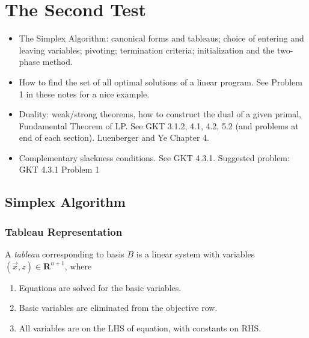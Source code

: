 \chapter{The Second Test}

\begin{itemize}
    \item The Simplex Algorithm: canonical forms and tableaus; choice of entering and leaving variables; pivoting; termination criteria; initialization and the two-phase method.
    \item How to find the set of all optimal solutions of a linear program. See Problem 1 in these notes for a nice example.
    \item Duality: weak/strong theorems, how to construct the dual of a given primal, Fundamental Theorem of LP. See GKT 3.1.2, 4.1, 4.2, 5.2 (and problems at end of each section). Luenberger and Ye Chapter 4.
    \item Complementary slackness conditions. See GKT 4.3.1. Suggested problem: GKT 4.3.1 Problem 1
\end{itemize}



\section{Simplex Algorithm}


\subsection{Tableau Representation}
A \textit{tableau} corresponding to basis $B$ is a linear system with variables $(\Vec{x}, z)\in\mathbf{R}^{n+1}$, where
\begin{enumerate}
    \item Equations are solved for the basic variables.
    \item Basic variables are eliminated from the objective row.
    \item All variables are on the LHS of equation, with constants on RHS.
\end{enumerate}


